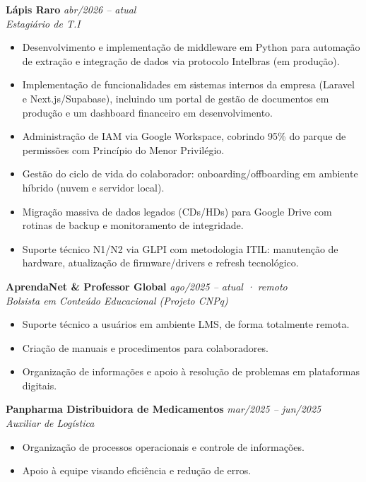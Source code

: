 \documentclass[11pt,a4paper]{article}
\begin{document}
\textbf{Lápis Raro} \hfill \textit{abr/2026 -- atual}\\
\textit{Estagiário de T.I}
\begin{itemize}
  \item Desenvolvimento e implementação de middleware em Python para automação de extração e
        integração de dados via protocolo Intelbras (em produção).
  \item Implementação de funcionalidades em sistemas internos da empresa (Laravel e Next.js/Supabase),
        incluindo um portal de gestão de documentos em produção e um dashboard financeiro em desenvolvimento.
  \item Administração de IAM via Google Workspace, cobrindo 95\% do parque de permissões com
        Princípio do Menor Privilégio.
  \item Gestão do ciclo de vida do colaborador: onboarding/offboarding em ambiente híbrido
        (nuvem e servidor local).
  \item Migração massiva de dados legados (CDs/HDs) para Google Drive com rotinas de backup
        e monitoramento de integridade.
  \item Suporte técnico N1/N2 via GLPI com metodologia ITIL: manutenção de hardware,
        atualização de firmware/drivers e refresh tecnológico.
\end{itemize}

\medskip

\textbf{AprendaNet \& Professor Global} \hfill \textit{ago/2025 -- atual · remoto}\\
\textit{Bolsista em Conteúdo Educacional (Projeto CNPq)}
\begin{itemize}
  \item Suporte técnico a usuários em ambiente LMS, de forma totalmente remota.
  \item Criação de manuais e procedimentos para colaboradores.
  \item Organização de informações e apoio à resolução de problemas em plataformas digitais.
\end{itemize}

\medskip

\textbf{Panpharma Distribuidora de Medicamentos} \hfill \textit{mar/2025 -- jun/2025}\\
\textit{Auxiliar de Logística}
\begin{itemize}
  \item Organização de processos operacionais e controle de informações.
  \item Apoio à equipe visando eficiência e redução de erros.
\end{itemize}
\end{document}
